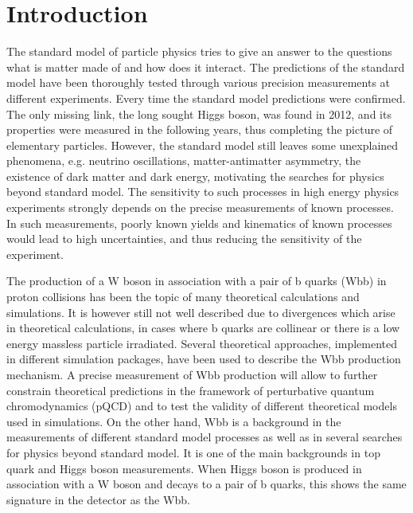 
\chapter{Introduction} %

\label{Chapter1} %


The standard model of particle physics tries to give an answer to the questions what is matter made of and how does it interact. The predictions of the standard model have been thoroughly tested through various precision measurements at different experiments. Every time the standard model predictions were confirmed. The only missing link, the long sought Higgs boson, was found in 2012, and its properties were measured in the following years, thus completing the picture of elementary particles. However, the standard model still leaves some unexplained phenomena, e.g. neutrino oscillations, matter-antimatter asymmetry, the existence of dark matter and dark energy, motivating the searches for physics beyond standard model. The sensitivity to such processes in high energy physics experiments strongly depends on the precise measurements of known processes. In such measurements, poorly known yields and kinematics of known processes would lead to high uncertainties, and thus reducing the sensitivity of the experiment. 
\par The production of a W boson in association with a pair of b quarks (Wbb) in proton collisions has
been the topic of many theoretical calculations and simulations. It is however still not well described due to divergences which arise in theoretical calculations, in cases where b quarks are collinear or there is a low energy massless particle irradiated. Several theoretical
approaches, implemented in different simulation packages, have been used to describe the Wbb production mechanism. A precise measurement of Wbb production will allow to
further constrain theoretical predictions in the framework of perturbative quantum chromodynamics (pQCD) and to test the validity of different theoretical models used in simulations. On the other hand, Wbb is a background in the measurements of different standard model processes as well as in several searches for physics beyond standard model. It is one of the main backgrounds in top quark  and Higgs boson measurements. When Higgs boson is produced in association with a W boson and decays to a pair of b quarks, this shows the same signature in the detector as the Wbb.
